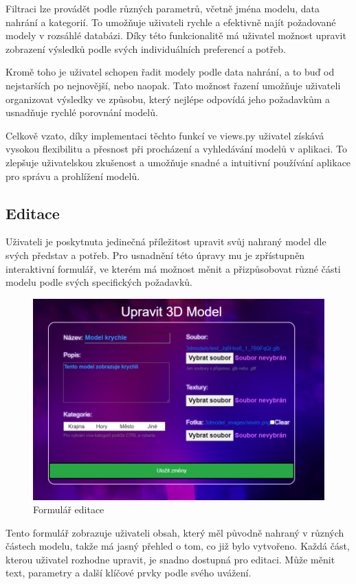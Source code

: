 \documentclass[12pt, a4paper,
twoside,        %
openright
]{report}
\begin{document}
Filtraci lze provádět podle různých parametrů, včetně jména modelu, data nahrání a kategorií. To umožňuje uživateli rychle a efektivně najít požadované modely v rozsáhlé databázi. Díky této funkcionalitě má uživatel možnost upravit zobrazení výsledků podle svých individuálních preferencí a potřeb.

Kromě toho je uživatel schopen řadit modely podle data nahrání, a to buď od nejstarších po nejnovější, nebo naopak. Tato možnost řazení umožňuje uživateli organizovat výsledky ve způsobu, který nejlépe odpovídá jeho požadavkům a usnadňuje rychlé porovnání modelů.

Celkově vzato, díky implementaci těchto funkcí ve views.py uživatel získává vysokou flexibilitu a přesnost při procházení a vyhledávání modelů v aplikaci. To zlepšuje uživatelskou zkušenost a umožňuje snadné a intuitivní používání aplikace pro správu a prohlížení modelů.
		
		\subsection[Editace]{Editace}
		Uživateli je poskytnuta jedinečná příležitost upravit svůj nahraný model dle svých představ a potřeb. Pro usnadnění této úpravy mu je zpřístupněn interaktivní formulář, ve kterém má možnost měnit a přizpůsobovat různé části modelu podle svých specifických požadavků.

\begin{figure}[h]
			\centering
			\includegraphics[width=1\linewidth]{image/edit.png} 
			\caption{Formulář editace}
		\end{figure}
		
Tento formulář zobrazuje uživateli obsah, který měl původně nahraný v různých částech modelu, takže má jasný přehled o tom, co již bylo vytvořeno. Každá část, kterou uživatel rozhodne upravit, je snadno dostupná pro editaci. Může měnit text, parametry a další klíčové prvky podle svého uvážení.
\end{document}
